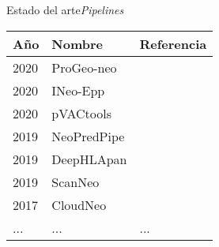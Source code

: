 \documentclass[10pt]{beamer}
\newcommand{\1}{
	\setbeamertemplate{background}{
		\texttt{[image: img/1]}
		\tikz[overlay] \fill[fill opacity=0.75,fill=white] (0,0) rectangle (-\paperwidth,\paperheight);
	}
}
\begin{document}
\begin{frame}{Estado del arte}{\textit{Pipelines}}
	\begin{table}[]
		\setlength{\tabcolsep}{0.5em} %
		{\renewcommand{\arraystretch}{1.4}%
			\begin{tabular}{lp{5cm}l}
				\textbf{Año} & \textbf{Nombre} & \textbf{Referencia}  \\ \hline
				2020  & ProGeo-neo     &\cite{li2020progeo}   \\
				2020  & INeo-Epp     &\cite{wang2020ineo}   \\
				2020  & pVACtools     &\cite{hundal2020pvactools}   \\
				2019  & NeoPredPipe     &\cite{schenck2019neopredpipe}   \\
				2019  & DeepHLApan     &\cite{wu2019deephlapan}   \\
				2019  & ScanNeo     &\cite{wang2019scanneo}   \\     
				2017  & CloudNeo     &\cite{bais2017cloudneo}   \\     
				... & ... & ... \\              
			\end{tabular}
		}
	\end{table}
\end{frame}
\end{document}
